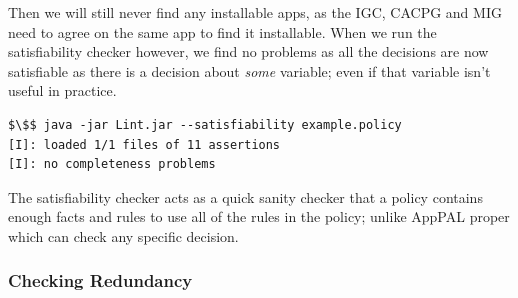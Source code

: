 \documentclass[a4paper]{scrartcl}
\begin{document}
Then we will still never find any installable apps, as the IGC, CACPG and MIG
need to agree on the same app to find it installable.  When we run the
satisfiability checker however, we find no problems as all the decisions are now
satisfiable as there is a decision about \emph{some} variable; even if that
variable isn't useful in practice.

\begin{lstlisting}
$\$$ java -jar Lint.jar --satisfiability example.policy
[I]: loaded 1/1 files of 11 assertions
[I]: no completeness problems
\end{lstlisting}

The satisfiability checker acts as a quick sanity checker that a policy contains
enough facts and rules to use all of the rules in the policy; unlike AppPAL
proper which can check any specific decision.

%

\subsubsection{Checking Redundancy}
\end{document}
